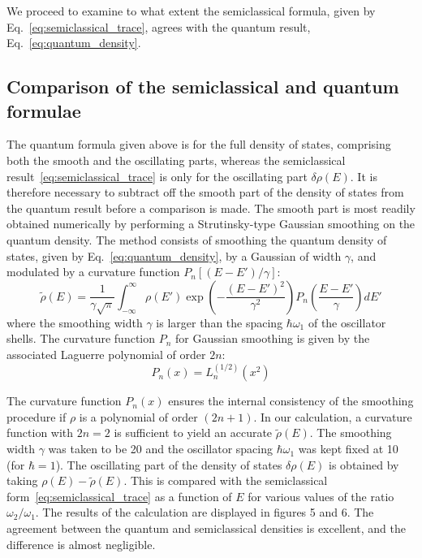 \documentclass[11pt]{article}
\theoremstyle{plain}
\begin{document}
We proceed to examine to what extent the semiclassical formula, given by Eq.~\eqref{eq:semiclassical_trace}, agrees with the quantum result, Eq.~\eqref{eq:quantum_density}.

\subsection{Comparison of the semiclassical and quantum formulae}

The quantum formula given above is for the full density of states, comprising both the smooth and the oscillating parts, whereas the semiclassical result~\eqref{eq:semiclassical_trace} is only for the oscillating part $\delta\rho(E)$. It is therefore necessary to subtract off the smooth part of the density of states from the quantum result before a comparison is made. The smooth part is most readily obtained numerically by performing a Strutinsky-type Gaussian smoothing \cite{strutinsky1966,ross1972} on the quantum density. The method consists of smoothing the quantum density of states, given by Eq.~\eqref{eq:quantum_density}, by a Gaussian of width $\gamma$, and modulated by a curvature function $P_n[(E - E')/\gamma]$:
\begin{equation}
\tilde{\rho}(E) = \frac{1}{\gamma\sqrt{\pi}} \int_{-\infty}^{\infty} \rho(E') \exp\left(-\frac{(E-E')^2}{\gamma^2}\right) P_n\left(\frac{E-E'}{\gamma}\right) dE'
\label{eq:smoothing}
\end{equation}
where the smoothing width $\gamma$ is larger than the spacing $\hbar\omega_1$ of the oscillator shells. The curvature function $P_n$ for Gaussian smoothing is given by the associated Laguerre polynomial of order $2n$:
\begin{equation}
P_n(x) = L_n^{(1/2)}(x^2)
\label{eq:curvature_function}
\end{equation}

The curvature function $P_n(x)$ ensures the internal consistency of the smoothing procedure if $\rho$ is a polynomial of order $(2n+1)$. In our calculation, a curvature function with $2n = 2$ is sufficient to yield an accurate $\tilde{\rho}(E)$. The smoothing width $\gamma$ was taken to be 20 and the oscillator spacing $\hbar\omega_1$ was kept fixed at 10 (for $\hbar = 1$). The oscillating part of the density of states $\delta\rho(E)$ is obtained by taking $\rho(E) - \tilde{\rho}(E)$. This is compared with the semiclassical form~\eqref{eq:semiclassical_trace} as a function of $E$ for various values of the ratio $\omega_2/\omega_1$. The results of the calculation are displayed in figures 5 and 6. The agreement between the quantum and semiclassical densities is excellent, and the difference is almost negligible.
\end{document}
